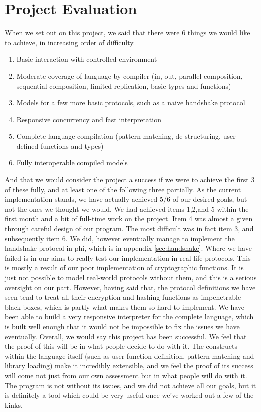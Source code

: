 \section{Project Evaluation}

When we set out on this project, we said that there were 6 things we would like to achieve, in increasing order of difficulty.
\begin{enumerate}
    \item Basic interaction with controlled environment
    \item Moderate coverage of language by compiler (in, out, parallel composition, sequential composition, limited replication, basic types and functions) 
    \item Models for a few more basic protocols, such as a naive handshake protocol
    \item Responsive concurrency and fast interpretation
    \item Complete language compilation (pattern matching, de-structuring, user defined functions and types)
    \item Fully interoperable compiled models
\end{enumerate}
And that we would consider the project a success if we were to achieve the first 3 of these fully, and at least one of the following three partially.
As the current implementation stands, we have actually achieved 5/6 of our desired goals, but not the ones we thought we would. We had achieved items 1,2,and 5 within the first month and a bit of full-time work on the project. Item 4 was almost a given through careful design of our program. The most difficult was in fact item 3, and subsequently item 6. We did, however eventually manage to implement the handshake protocol in phi, which is in appendix \ref{sec:handshake}.
Where we have failed is in our aims to really test our implementation in real life protocols. This is mostly a result of our poor implementation of cryptographic functions. It is just not
possible to model real-world protocols without them, and this is a serious oversight on our part. However, having said that, the protocol definitions we have seen tend to treat all their encryption and hashing functions as impenetrable black boxes, which is partly what makes them so hard to implement.
We have been able to build a very responsive interpreter for the complete language, which is built well enough that it would not be impossible to fix the issues we have eventually.
Overall, we would say this project has been successful. We feel that the proof of this will be in what people decide to do with it. The constructs within the language itself (such as user function definition, pattern matching and library loading) make it incredibly extensible, and we feel the proof of its success will come not just from our own assessment but in what people will do with it. 
The program is not without its issues, and we did not achieve all our goals, but it is definitely a tool which could be very useful once we've worked out a few of the kinks.

